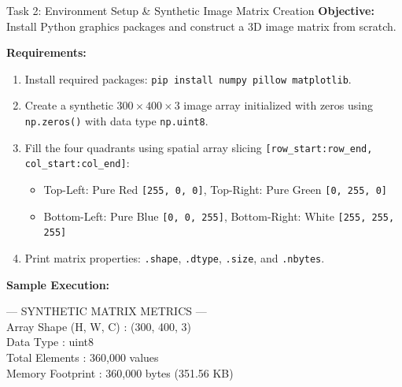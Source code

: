 \documentclass[12pt,a4paper]{article}
\begin{document}
\begin{taskbox}{Task 2: Environment Setup \& Synthetic Image Matrix Creation}
\textbf{Objective:} Install Python graphics packages and construct a 3D image matrix from scratch.

\textbf{Requirements:}
\begin{enumerate}[leftmargin=*]
    \item Install required packages: \texttt{pip install numpy pillow matplotlib}.
    \item Create a synthetic $300 \times 400 \times 3$ image array initialized with zeros using \texttt{np.zeros()} with data type \texttt{np.uint8}.
    \item Fill the four quadrants using spatial array slicing \texttt{[row\_start:row\_end, col\_start:col\_end]}:
    \begin{itemize}[leftmargin=*]
        \item Top-Left: Pure Red \texttt{[255, 0, 0]}, Top-Right: Pure Green \texttt{[0, 255, 0]}
        \item Bottom-Left: Pure Blue \texttt{[0, 0, 255]}, Bottom-Right: White \texttt{[255, 255, 255]}
    \end{itemize}
    \item Print matrix properties: \texttt{.shape}, \texttt{.dtype}, \texttt{.size}, and \texttt{.nbytes}.
\end{enumerate}
\end{taskbox}

\vspace{0.3em}
\textbf{Sample Execution:}

\begin{sampleoutputbox}
\color{white}\ttfamily
--- SYNTHETIC MATRIX METRICS ---\\
Array Shape (H, W, C) : (300, 400, 3)\\
Data Type            : uint8\\
Total Elements       : 360,000 values\\
Memory Footprint     : 360,000 bytes (351.56 KB)
\end{sampleoutputbox}

\vspace{0.4em}
\end{document}
